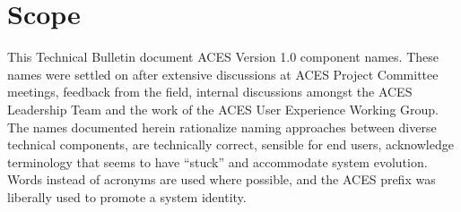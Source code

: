 \cleardoublepage
\numberedformat	
\chapter{Scope} 	%

This Technical Bulletin document ACES Version 1.0 component names. These names were settled on after extensive discussions at ACES Project Committee meetings, feedback from the field, internal discussions amongst the ACES Leadership Team and the work of the ACES User Experience Working Group. The names documented herein rationalize naming approaches between diverse technical components, are technically correct, sensible for end users, acknowledge terminology that seems to have ``stuck'' and accommodate system evolution. Words instead of acronyms are used where possible, and the ACES prefix was liberally used to promote a system identity.